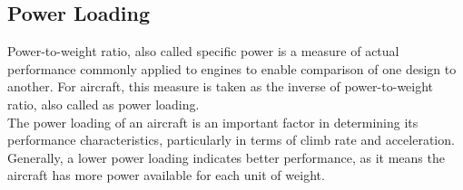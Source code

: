 \documentclass[12 pt]{article}
\begin{document}
\begin{table}[h]
\centering
{}
\caption{{Aerodynamic Data}}
\label{Aerodynamical Data}
\end{table}

\subsection{{Power Loading}}
Power-to-weight ratio, also called specific power is a measure of actual performance commonly applied to engines to enable comparison of one design to another. For aircraft, this measure is taken as the inverse of power-to-weight ratio, also called as power loading.\\
 
The power loading of an aircraft is an important factor in determining its performance characteristics, particularly in terms of climb rate and acceleration. Generally, a lower power loading indicates better performance, as it means the aircraft has more power available for each unit of weight.\\
\end{document}
